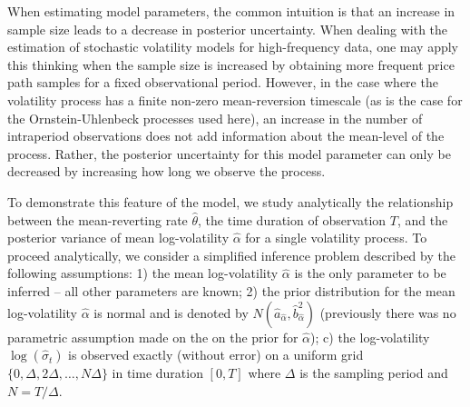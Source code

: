 \documentclass[10pt]{article}
\newcommand{\halpha}{\hat{\alpha}}
\begin{document}
When estimating model parameters, the common intuition is that an increase in sample size leads to a decrease in posterior uncertainty. When dealing with the estimation of stochastic volatility models for high-frequency data, one may apply this thinking when the sample size is increased by obtaining more frequent price path samples for a fixed observational period. However, in the case where the volatility process has a finite non-zero mean-reversion timescale (as is the case for the Ornstein-Uhlenbeck processes used here), an increase in the number of intraperiod observations does not add information about the mean-level of the process. Rather, the posterior uncertainty for this model parameter can only be decreased by increasing how long we observe the process.

To demonstrate this feature of the model, we study analytically the relationship between the mean-reverting rate $\hat{\theta}$, the time duration of observation $T$, and the posterior variance of mean log-volatility $\hat{\alpha}$ for a single volatility process.  To proceed analytically, we consider a simplified inference problem described by the following assumptions:  1) the mean log-volatility $\hat{\alpha}$ is the only parameter to be inferred -- all other parameters are known; 2) the prior distribution for the mean log-volatility $\hat{\alpha}$ is normal and is denoted by $N(\hat{a}_{\hat{\alpha}}, \hat{b}^2_{\hat{\alpha}}) $ (previously there was no parametric assumption made on the on the prior for $\halpha$); c) the log-volatility $\log( \hat{ \sigma }_t)$ is observed exactly (without error) on a uniform grid $\{0, \Delta, 2\Delta, \ldots , N\Delta \} $ in time duration $[0, T]$ where $\Delta $ is the sampling period and $N=T/\Delta $.
\end{document}
